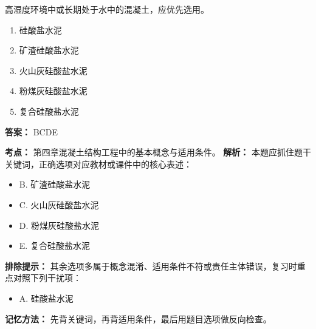 \documentclass[UTF8,fontset=fandol,11pt]{ctexart}
\begin{document}
\vspace{0.2em}

\begin{quizbox}[title={第 60 题}]
高湿度环境中或长期处于水中的混凝土，应优先选用。\\
\begin{enumerate}[label=\Alph*.]
\item 硅酸盐水泥
\item 矿渣硅酸盐水泥
\item 火山灰硅酸盐水泥
\item 粉煤灰硅酸盐水泥
\item 复合硅酸盐水泥
\end{enumerate}
\textbf{答案：} BCDE
\vspace{0.25em}
\begin{answerbox}[title={考点解析}]
\textbf{考点：} 第四章混凝土结构工程中的基本概念与适用条件。
\textbf{解析：} 本题应抓住题干关键词，正确选项对应教材或课件中的核心表述：
\begin{itemize}
\item B. 矿渣硅酸盐水泥
\item C. 火山灰硅酸盐水泥
\item D. 粉煤灰硅酸盐水泥
\item E. 复合硅酸盐水泥
\end{itemize}
\textbf{排除提示：} 其余选项多属于概念混淆、适用条件不符或责任主体错误，复习时重点对照下列干扰项：
\begin{itemize}
\item A. 硅酸盐水泥
\end{itemize}
\textbf{记忆方法：} 先背关键词，再背适用条件，最后用题目选项做反向检查。
\end{answerbox}
\end{quizbox}

\vspace{0.2em}
\end{document}
